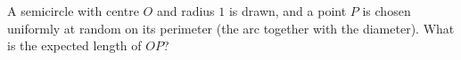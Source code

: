 A semicircle with centre $O$ and radius $1$ is drawn, and a point $P$ is chosen uniformly at random on its perimeter (the arc together with the diameter). What is the expected length of $OP$?
